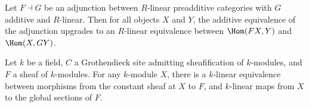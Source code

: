 \begin{theorem}
  \label{def:Adjunction_homLinearEquiv}
  
  Let \(F \dashv G\) be an adjunction between \(R\)-linear preadditive categories with \(G\) additive and \(R\)-linear. Then for all objects \(X\) and \(Y\), the additive equivalence of the adjunction upgrades to an \(R\)-linear equivalence between \(\Hom(FX, Y)\) and \(\Hom(X, GY)\).
\end{theorem}

\begin{theorem}
  \label{def:Scheme_constantSheafGammaHom_linearEquiv}
  Let \(k\) be a field, \(C\) a Grothendieck site admitting sheafification of \(k\)-modules, and \(F\) a sheaf of \(k\)-modules. For any \(k\)-module \(X\), there is a \(k\)-linear equivalence between morphisms from the constant sheaf at \(X\) to \(F\), and \(k\)-linear maps from \(X\) to the global sections of \(F\).
\end{theorem}
